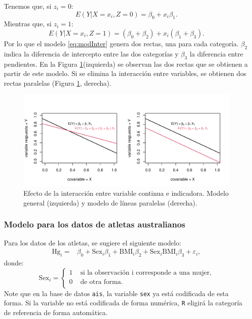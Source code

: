 \documentclass[
]{article}
\begin{document}
Tenemos que, si \(z_i=0\):
\[
E(Y | X=x_i, Z=0) = \beta_{0} + x_{i}\beta_{1}.
\]
Mientras que, si \(z_i=1\):
\[
E(Y | X=x_i, Z=1) = (\beta_{0}+\beta_{2}) + x_{i}(\beta_{1}+\beta_{3}).
\]
Por lo que el modelo \eqref{eq:modInter} genera dos rectas, una para cada categoría. \(\beta_2\) indica la diferencia de intercepto entre las dos categorías y \(\beta_3\) la diferencia entre pendientes. En la Figura \ref{fig:Rectas1}(izquierda) se observan las dos rectas que se obtienen a partir de este modelo. Si se elimina la interacción entre variables, se obtienen dos rectas paralelas (Figura \ref{fig:Rectas1}, derecha).

\begin{figure}

{\centering \includegraphics{MLG2_files/figure-latex/Rectas1-1} 

}

\caption{Efecto de la interacción entre variable continua e indicadora. Modelo general (izquierda) y modelo de líneas paralelas (derecha).}\label{fig:Rectas1}
\end{figure}

\hypertarget{modelo-para-los-datos-de-atletas-australianos}{%
\subsubsection{Modelo para los datos de atletas australianos}\label{modelo-para-los-datos-de-atletas-australianos}}

Para los datos de los atletas, se sugiere el siguiente modelo:
\begin{equation}
\begin{split}
\mbox{Hg}_{i} =& \beta_{0} + \mbox{Sex}_{i}\beta_{1} + \mbox{BMI}_{i}\beta_{2} + \mbox{Sex}_{i}\mbox{BMI}_{i}\beta_{3} + \varepsilon_{i},
\end{split}
\nonumber
\end{equation}
donde:
\[
\mbox{Sex}_{i} = \begin{cases}
1 & \mbox{ si la observación i corresponde a una mujer}, \\
0 & \mbox{ de otra forma}. \\
\end{cases}
\]
Note que en la base de datos \texttt{ais}, la variable \texttt{sex} ya está codificada de esta forma. Si la variable no está codificada de forma numérica, \texttt{R} eligirá la categoría de referencia de forma automática.
\end{document}
